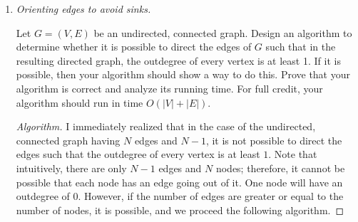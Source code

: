 \documentclass[11pt]{article}
\newcounter{totalpoints}
\newcommand{\points}[1]{\addtocounter{totalpoints}{#1}{[#1 point\ifthenelse{\equal{#1}{1}}{}{s}]}}
\begin{document}
\begin{enumerate}[leftmargin=*,start=0]
\begin{proof}[Algorithm]
  \hfill

  Therefore, the time complexity of this algorithm is $\mathcal{O}(k * k) = \mathcal{O}(k^2)$, as desired.

\end{proof}
\newpage

\item \emph{Orienting edges to avoid sinks.} \points{25}

Let $G=(V,E)$ be an undirected, connected graph. Design an algorithm to determine whether it is possible to direct the edges of $G$ such that in the resulting directed graph, the outdegree of every vertex is at least 1. If it is possible, then your algorithm should show a way to do this. Prove that your algorithm is correct and analyze its running time. For full credit, your algorithm should run in time $O(|V|+|E|)$.

\begin{proof}[Algorithm]
  \hfill

  I immediately realized that in the case of the undirected, connected graph having $N$ edges and $N-1$, 
  it is not possible to direct the edges such that the outdegree of every vertex is at least $1$. Note that intuitively, 
  there are only $N-1$ edges and $N$ nodes; therefore, it cannot be possible that each node has an edge going out of it. One node will have an 
  outdegree of $0$. However, if the number of edges are greater or equal to the number of nodes, it is possible, and we proceed the following algorithm.


\end{proof}
\end{enumerate}
\end{document}
